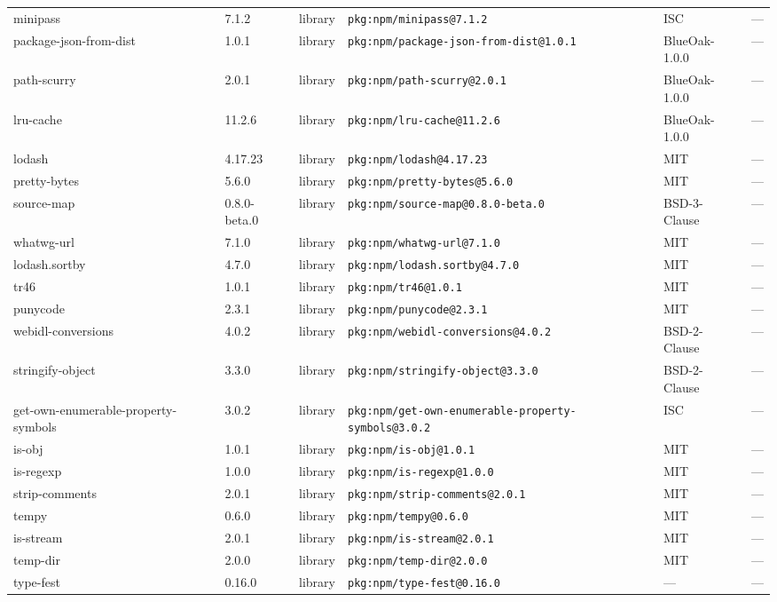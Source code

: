 \documentclass[11pt]{article}
\begin{document}
\begin{longtable}{|l|l|l|p{2.2cm}|l|p{4cm}|}
minipass & 7.1.2 & library & \texttt{pkg:npm/minipass@7.1.2} & ISC & — \\
package-json-from-dist & 1.0.1 & library & \texttt{pkg:npm/package-json-from-dist@1.0.1} & BlueOak-1.0.0 & — \\
path-scurry & 2.0.1 & library & \texttt{pkg:npm/path-scurry@2.0.1} & BlueOak-1.0.0 & — \\
lru-cache & 11.2.6 & library & \texttt{pkg:npm/lru-cache@11.2.6} & BlueOak-1.0.0 & — \\
lodash & 4.17.23 & library & \texttt{pkg:npm/lodash@4.17.23} & MIT & — \\
pretty-bytes & 5.6.0 & library & \texttt{pkg:npm/pretty-bytes@5.6.0} & MIT & — \\
source-map & 0.8.0-beta.0 & library & \texttt{pkg:npm/source-map@0.8.0-beta.0} & BSD-3-Clause & — \\
whatwg-url & 7.1.0 & library & \texttt{pkg:npm/whatwg-url@7.1.0} & MIT & — \\
lodash.sortby & 4.7.0 & library & \texttt{pkg:npm/lodash.sortby@4.7.0} & MIT & — \\
tr46 & 1.0.1 & library & \texttt{pkg:npm/tr46@1.0.1} & MIT & — \\
punycode & 2.3.1 & library & \texttt{pkg:npm/punycode@2.3.1} & MIT & — \\
webidl-conversions & 4.0.2 & library & \texttt{pkg:npm/webidl-conversions@4.0.2} & BSD-2-Clause & — \\
stringify-object & 3.3.0 & library & \texttt{pkg:npm/stringify-object@3.3.0} & BSD-2-Clause & — \\
get-own-enumerable-property-symbols & 3.0.2 & library & \texttt{pkg:npm/get-own-enumerable-property-symbols@3.0.2} & ISC & — \\
is-obj & 1.0.1 & library & \texttt{pkg:npm/is-obj@1.0.1} & MIT & — \\
is-regexp & 1.0.0 & library & \texttt{pkg:npm/is-regexp@1.0.0} & MIT & — \\
strip-comments & 2.0.1 & library & \texttt{pkg:npm/strip-comments@2.0.1} & MIT & — \\
tempy & 0.6.0 & library & \texttt{pkg:npm/tempy@0.6.0} & MIT & — \\
is-stream & 2.0.1 & library & \texttt{pkg:npm/is-stream@2.0.1} & MIT & — \\
temp-dir & 2.0.0 & library & \texttt{pkg:npm/temp-dir@2.0.0} & MIT & — \\
type-fest & 0.16.0 & library & \texttt{pkg:npm/type-fest@0.16.0} & — & — \\

\end{longtable}
\end{document}
